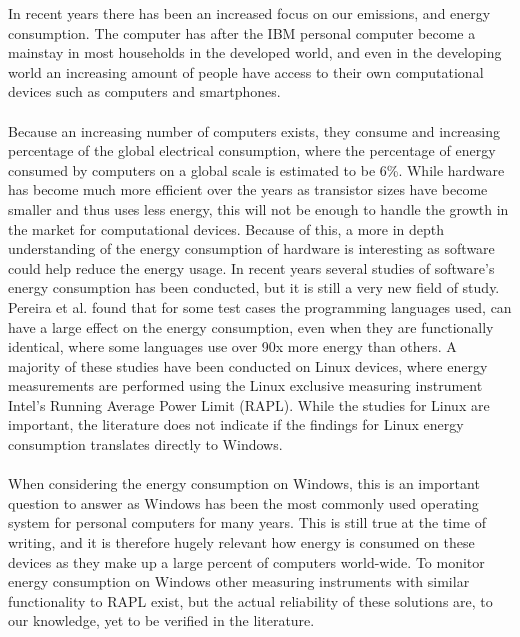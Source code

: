 In recent years there has been an increased focus on our emissions, and energy consumption. 
The computer has after the IBM personal computer become a mainstay in most households in the developed world, and even in the developing world an increasing amount of people have access to their own computational devices such as computers and smartphones\cite{DevelopedWorldPC}. 

\paragraph*{}
Because an increasing number of computers exists, they consume and increasing percentage of the global electrical consumption, where the percentage of energy consumed by computers on a global scale is estimated to be 6\%\cite*{somavat2011energy}. While hardware has become much more efficient over the years as transistor sizes have become smaller and thus uses less energy, this will not be enough to handle the growth in the market for computational devices. Because of this, a more in depth understanding of the energy consumption of hardware is interesting as software could help reduce the energy usage\cite{somavat2011energy}. In recent years several studies of software's energy consumption has been conducted, but it is still a very new field of study. Pereira et al.\cite*{Pereira2017} found that for some test cases the programming languages used, can have a large effect on the energy consumption, even when they are functionally identical, where some languages use over 90x more energy than others. A majority of these studies have been conducted on Linux devices, where energy measurements are performed using the Linux exclusive measuring instrument Intel's Running Average Power Limit (RAPL). While the studies for Linux are important, the literature does not indicate if the findings for Linux energy consumption translates directly to Windows\cite{Pereira2017}. 

\paragraph*{}
When considering the energy consumption on Windows, this is an important question to answer as Windows has been the most commonly used operating system for personal computers for many years. This is still true at the time of writing, and it is therefore hugely relevant how energy is consumed on these devices as they make up a large percent of computers world-wide\cite{OSShare}. To monitor energy consumption on Windows other measuring instruments with similar functionality to RAPL exist, but the actual reliability of these solutions are, to our knowledge, yet to be verified in the literature.

